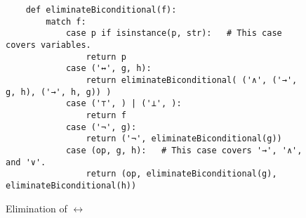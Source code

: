 \begin{figure}[!ht]
  \centering
\begin{verbatim}
    def eliminateBiconditional(f):
        match f:
            case p if isinstance(p, str):   # This case covers variables.
                return p
            case ('↔', g, h):
                return eliminateBiconditional( ('∧', ('→', g, h), ('→', h, g)) )
            case ('⊤', ) | ('⊥', ):
                return f
            case ('¬', g):
                return ('¬', eliminateBiconditional(g))
            case (op, g, h):   # This case covers '→', '∧', and '∨'.
                return (op, eliminateBiconditional(g), eliminateBiconditional(h))
\end{verbatim}
\vspace*{-0.3cm}
  \caption{Elimination of $\leftrightarrow$}
  \label{fig:elimBiconditional}
\end{figure} 

